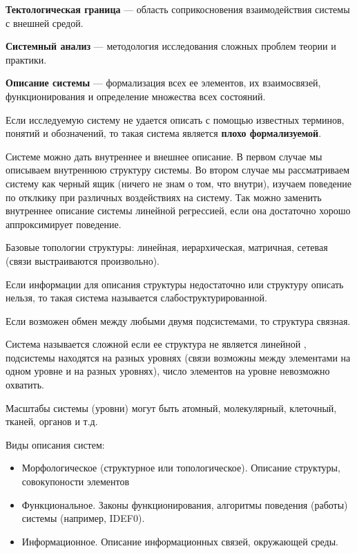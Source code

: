 \textbf{Тектологическая граница} --- область соприкосновения взаимодействия системы с
внешней средой.

\textbf{Системный анализ} --- методология исследования сложных проблем теории и
практики.

\textbf{Описание системы} --- формализация всех ее элементов, их взаимосвязей,
функционирования и определение множества всех состояний.

Если исследуемую систему не удается описать с помощью известных терминов,
понятий и обозначений, то такая система является \textbf{плохо формализуемой}.

Системе можно дать внутреннее и внешнее описание. В первом случае мы описываем
внутреннюю структуру системы. Во втором случае мы рассматриваем систему как
черный ящик (ничего не знам о том, что внутри), изучаем поведение по отклкику
при различных воздействиях на систему. Так можно заменить внутреннее описание
системы линейной регрессией, если она достаточно хорошо аппроксимирует
поведение.

Базовые топологии структуры: линейная, иерархическая, матричная, сетевая
(связи выстраиваются произвольно).

Если информации для описания структуры недостаточно или структуру описать
нельзя, то такая система называется слабоструктурированной.

Если возможен обмен между любыми двумя подсистемами, то структура связная.

Система называется сложной если ее структура не является линейной , подсистемы
находятся на разных уровнях (связи возможны между элементами на одном уровне и
на разных уровнях), число элементов на уровне невозможно охватить.

Масштабы системы (уровни) могут быть атомный, молекулярный, клеточный, тканей,
органов и т.д.

Виды описания систем:
\begin{itemize}
    \item Морфологическое (структурное или топологическое). Описание структуры,
        совокупоности элементов

    \item Функциональное. Законы функционирования, алгоритмы поведения (работы)
        системы (например, IDEF0).

    \item Информационное. Описание информационных связей, окружающей среды.
\end{itemize}

